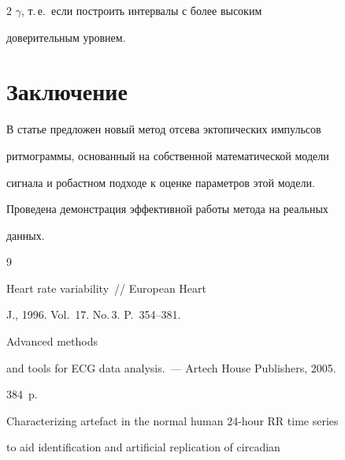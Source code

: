 \begin{multicols}{2}
$\gamma$, т.\,е.\ если построить интервалы с более высоким


доверительным уровнем.





\section{Заключение}%





В  статье предложен новый метод отсева эктопических импульсов


ритмограммы, основанный на собственной математической модели


сигнала и робастном подходе к оценке параметров этой модели.


Проведена демонстрация эффективной работы метода на реальных


данных.





{\small\frenchspacing


{%




\begin{thebibliography}{9}









Heart rate variability~// European Heart


J., 1996. Vol.~17. No.\,3. P.~354--381.









Advanced methods


and tools for ECG data analysis.~--- Artech House Publishers, 2005.


384~p.









Characterizing artefact in the normal human 24-hour RR time series


to aid identification and artificial replication of circadian



\end{thebibliography}}}
\end{multicols}
